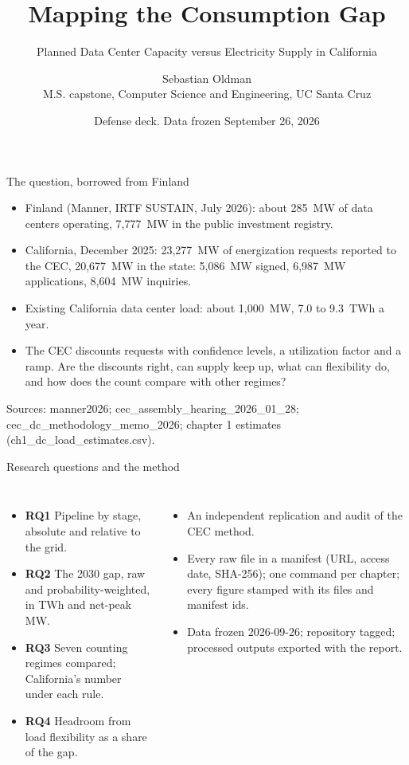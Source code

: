 \documentclass[aspectratio=169,10pt]{beamer}
\title{Mapping the Consumption Gap}
\subtitle{Planned Data Center Capacity versus Electricity Supply in California}
\author{Sebastian Oldman\\[3pt]\small M.S. capstone, Computer Science and Engineering, UC Santa Cruz}
\date{Defense deck. Data frozen September 26, 2026}
\newcommand{\src}[1]{\vfill{\tiny\color{black!55}#1}}
\begin{document}
\begin{frame}
\titlepage
\end{frame}

\begin{frame}{The question, borrowed from Finland}
\begin{itemize}
\item Finland (Manner, IRTF SUSTAIN, July 2026): about 285~MW of data centers operating, 7,777~MW in the public investment registry.
\item California, December 2025: 23,277~MW of energization requests reported to the CEC, 20,677~MW in the state: 5,086~MW signed, 6,987~MW applications, 8,604~MW inquiries.
\item Existing California data center load: about 1,000~MW, 7.0 to 9.3~TWh a year.
\item The CEC discounts requests with confidence levels, a utilization factor and a ramp. Are the discounts right, can supply keep up, what can flexibility do, and how does the count compare with other regimes?
\end{itemize}
\src{Sources: manner2026; cec\_assembly\_hearing\_2026\_01\_28; cec\_dc\_methodology\_memo\_2026; chapter 1 estimates (ch1\_dc\_load\_estimates.csv).}
\end{frame}

\begin{frame}{Research questions and the method}
\begin{columns}[T]
\begin{itemize}
\item \textbf{RQ1} Pipeline by stage, absolute and relative to the grid.
\item \textbf{RQ2} The 2030 gap, raw and probability-weighted, in TWh and net-peak MW.
\item \textbf{RQ3} Seven counting regimes compared; California's number under each rule.
\item \textbf{RQ4} Headroom from load flexibility as a share of the gap.
\end{itemize}
\begin{itemize}
\item An independent replication and audit of the CEC method.
\item Every raw file in a manifest (URL, access date, SHA-256); one command per chapter; every figure stamped with its files and manifest ids.
\item Data frozen 2026-09-26; repository tagged; processed outputs exported with the report.
\end{itemize}
\end{columns}
\end{frame}
\end{document}
